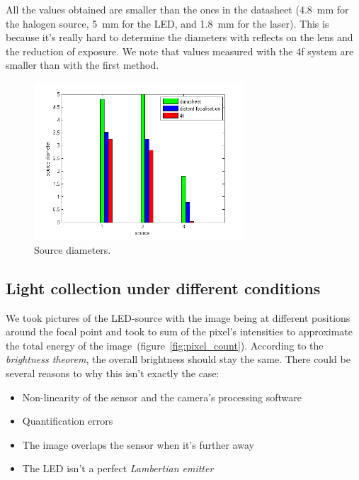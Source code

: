 \documentclass[a4paper, 12pt]{paper}
\begin{document}
All the values obtained are smaller than the ones in the datasheet (\SI{4.8}{\milli\meter} for the halogen source, \SI{5}{\milli\meter} for the LED, and \SI{1.8}{\milli\meter} for the laser).
This is because it's really hard to determine the diameters with reflects on the lens and the reduction of exposure.
We note that values measured with the 4f system are smaller than with the first method.

\begin{figure}[H]
    \centering
    \includegraphics[width=0.7\textwidth]{img/source_diameters_graph}
    \caption{Source diameters.}
\label{fig:source_diameter_graph}
\end{figure}

\subsection{Light collection under different conditions}

We took pictures of the LED-source with the image being at different positions around the focal point and took to sum of the pixel's intensities to approximate the total energy of the image~(figure~\ref{fig:pixel_count}).
According to the \emph{brightness theorem}, the overall brightness should stay the same.
There could be several reasons to why this isn't exactly the case:
\begin{itemize}
    \item Non-linearity of the sensor and the camera's processing software
    \item Quantification errors
    \item The image overlaps the sensor when it's further away
    \item The LED isn't a perfect \emph{Lambertian emitter}
\end{itemize}
\end{document}
